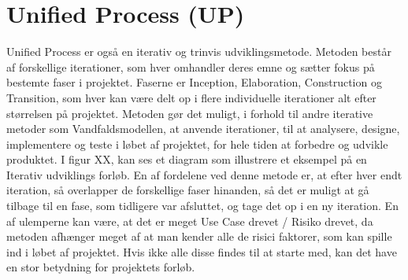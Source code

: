 \section{Unified Process (UP)}
Unified Process er også en iterativ og trinvis udviklingsmetode. Metoden består af forskellige iterationer, som hver omhandler deres emne og sætter fokus på bestemte faser i projektet. Faserne er Inception, Elaboration, Construction og Transition, som hver kan være delt op i flere individuelle iterationer alt efter størrelsen på projektet.\cite{UP}
Metoden gør det muligt, i forhold til andre iterative metoder som Vandfaldsmodellen, at anvende iterationer, til at analysere, designe, implementere og teste i løbet af projektet, for hele tiden at forbedre og udvikle produktet. I figur XX, kan ses et diagram som illustrere et eksempel på en Iterativ udviklings forløb. En af fordelene ved denne metode er, at efter hver endt iteration, så overlapper de forskellige faser hinanden, så det er muligt at gå tilbage til en fase, som tidligere var afsluttet, og tage det op i en ny iteration. En af ulemperne kan være, at det er meget Use Case drevet / Risiko drevet, da metoden afhænger meget af at man kender alle de risici faktorer, som kan spille ind i løbet af projektet. Hvis ikke alle disse findes til at starte med, kan det have en stor betydning for projektets forløb.\cite{UPPrincipper}
